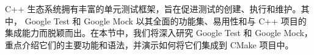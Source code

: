 C++ 生态系统拥有丰富的单元测试框架，旨在促进测试的创建、执行和维护。其中， Google Test 和 Google Mock 以其全面的功能集、易用性和与 C++ 项目的集成能力而脱颖而出。在本节中，我们将深入研究 Google Test 和 Google Mock，重点介绍它们的主要功能和语法，并演示如何将它们集成到 CMake 项目中。


